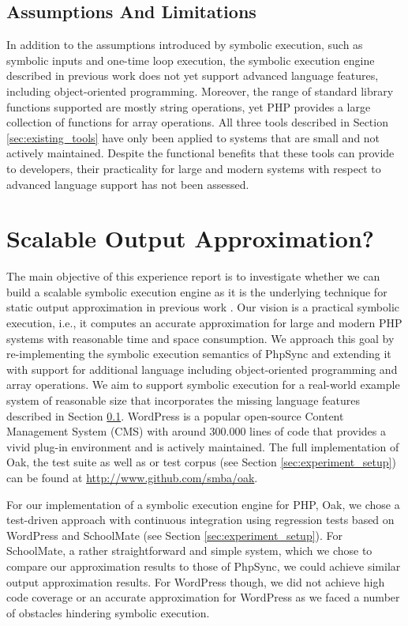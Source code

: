 \documentclass[sigconf, preprint]{acmart}
\renewcommand{\sf}[1]{\textsf{#1}}
\begin{document}
\subsection{Assumptions And Limitations}\label{sec:limitations}
In addition to the assumptions introduced by symbolic execution, such as
symbolic inputs and one-time loop execution, the symbolic execution
engine described in previous work \cite{Nguyen:2014:BCG:2635868.2635928} does
not yet support advanced language features, including object-oriented
programming.
Moreover, the range of standard library functions supported are mostly string operations, yet PHP
provides a large collection of functions for array operations.
All three tools described in Section \ref{sec:existing_tools} have
only been applied to systems that are small and not actively maintained.
Despite the functional benefits that these tools can provide to developers,
their practicality for large and modern systems with respect to advanced language support has not been
assessed.

\section{Scalable Output Approximation?} \label{sec:3}
The main objective of this experience report is to investigate whether we can
build a scalable symbolic execution engine as it is the underlying technique
for static output approximation in previous work
\cite{Nguyen:2011:AFH:2190078.2190142,Nguyen:2014:BCG:2635868.2635928,Nguyen:2015:CPS:2786805.2786872,Nguyen:2015:VIS:2819009.2819140}.
Our vision is a practical symbolic execution, i.e., it computes an accurate
approximation for large and modern PHP systems with reasonable time and space consumption.
We approach this goal by re-implementing the symbolic execution semantics  of
\sf{PhpSync} \cite{Nguyen:2014:BCG:2635868.2635928} and extending it with support for additional language
including object-oriented programming and array operations. We aim to support symbolic
execution for a real-world example system of reasonable size that incorporates
the missing language features described in Section \ref{sec:limitations}.
\textsf{WordPress} is a popular open-source Content Management System (CMS)
with around 300.000 lines of code that provides a vivid
plug-in environment and is actively maintained. The full implementation of
\sf{Oak}, the test suite as well as or test corpus (see Section \ref{sec:experiment_setup}) can be found at
\url{http://www.github.com/smba/oak}.

For our implementation of a symbolic execution engine for PHP, \sf{Oak}, we
chose a test-driven approach with continuous integration using regression tests
based on \sf{WordPress} and \sf{SchoolMate} (see Section
\ref{sec:experiment_setup}). For \sf{SchoolMate}, a rather straightforward and
simple system, which we chose to compare our approximation results to those of
\sf{PhpSync}, we could achieve similar output approximation results. For
\sf{WordPress} though, we did not achieve high code coverage or an accurate
approximation for \sf{WordPress} as we faced a number of obstacles hindering
symbolic execution.
\end{document}
